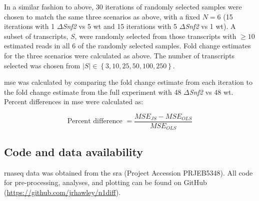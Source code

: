 In a similar fashion to above, 30 iterations of randomly selected samples were chosen to match the same three scenarios as above, with a fixed $N = 6$ (15 iterations with 1 $\Delta$\emph{Snf2} vs 5 \gls{wt} and 15 iterations with 5 $\Delta$\emph{Snf2} vs 1 \gls{wt}).
A subset of transcripts, $S$, were randomly selected from those transcripts with $\ge 10$ estimated reads in all 6 of the randomly selected samples.
Fold change estimates for the three scenarios were calculated as above.
The number of transcripts selected was chosen from $|S| \in \left\{3, 10, 25, 50, 100, 250 \right\}$.

\Gls{mse} was calculated by comparing the fold change estimate from each iteration to the fold change estimate from the full experiment with 48 $\Delta$\emph{Snf2} vs 48 \gls{wt}.
Percent differences in \gls{mse} were calculated as:

\begin{equation*}
  \text{Percent difference } = \frac{MSE_{JS} - MSE_{OLS}}{MSE_{OLS}}
\end{equation*}

\subsection{Code and data availability}

\Gls{rnaseq} data was obtained from the \gls{sra} \cite{leinonenSequenceReadArchive2011} (Project Accession PRJEB5348).
All code for pre-processing, analyses, and plotting can be found on GitHub (\url{https://github.com/jrhawley/n1diff}).
